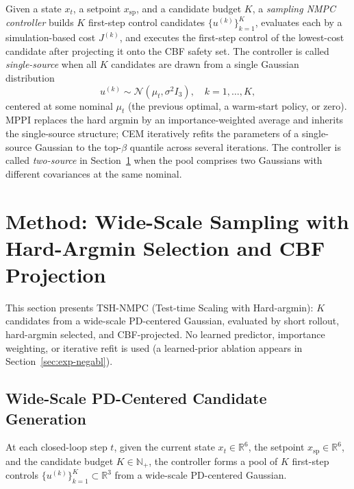 \documentclass[11pt,onecolumn,a4paper]{article}
\newcommand{\R}{\mathbb{R}}
\newcommand{\spt}{\mathrm{sp}}
\begin{document}
Given a state $x_t$, a setpoint $x_\spt$, and a candidate budget $K$,
a \emph{sampling NMPC controller} builds $K$ first-step control
candidates $\{u^{(k)}\}_{k=1}^{K}$, evaluates each by a
simulation-based cost $J^{(k)}$, and executes the first-step control
of the lowest-cost candidate after projecting it onto the CBF safety
set. The controller is called \emph{single-source} when all $K$
candidates are drawn from a single Gaussian distribution
\begin{equation}\label{eq:single}
u^{(k)} \sim \mathcal{N}(\mu_t, \sigma^2 I_3),\quad k = 1,\dots,K,
\end{equation}
centered at some nominal $\mu_t$ (the previous optimal, a warm-start
policy, or zero). MPPI \cite{WIL17} replaces the hard argmin by an
importance-weighted average and inherits the single-source structure;
CEM \cite{BOT13} iteratively refits the parameters of a single-source
Gaussian to the top-$\beta$ quantile across several iterations. The
controller is called \emph{two-source} in Section~\ref{sec:method}
when the pool comprises two Gaussians with different covariances at
the same nominal.

\section{Method: Wide-Scale Sampling with Hard-Argmin Selection and CBF Projection}\label{sec:method}

This section presents TSH-NMPC (Test-time Scaling with Hard-argmin):
$K$ candidates from a wide-scale PD-centered Gaussian, evaluated by
short rollout, hard-argmin selected, and CBF-projected. No learned
predictor, importance weighting, or iterative refit is used (a
learned-prior ablation appears in Section~\ref{sec:exp-negabl}).

\subsection{Wide-Scale PD-Centered Candidate Generation}

At each closed-loop step $t$, given the current state $x_t \in \R^6$,
the setpoint $x_\spt \in \R^6$, and the candidate budget
$K \in \mathbb{N}_+$, the controller forms a pool of $K$ first-step
controls $\{u^{(k)}\}_{k=1}^K \subset \R^3$ from a wide-scale
PD-centered Gaussian.
\end{document}
